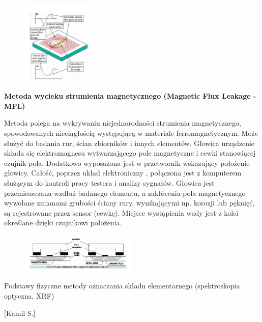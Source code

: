 \documentclass{article}
\begin{document}
\begin{enumerate}
  \begin{figure}[h!]
\centering
\includegraphics[width=0.3\textwidth]{zmiennepole}
\end{figure}
 
 
 
 {\bf Metoda wycieku strumienia magnetycznego (Magnetic Flux Leakage - MFL) }
 
 Metoda polega na wykrywaniu niejednorodności strumienia magnetycznego, spowodowanych nieciągłością występującą w materiale ferromagnetycznym. Może służyć do badania rur, ścian zbiorników i innych elementów. Głowica urządzenie składa się elektromagnesu wytwarzającego pole magnetyczne i cewki stanowiącej czujnik pola. Dodatkowo wyposażona jest w przetwornik wskazujący położenie głowicy. Całość, poprzez układ elektroniczny , połączona jest z komputerem służącym do kontroli pracy testera i analizy sygnałów. Głowica jest przemieszczana wzdłuż badanego elementu, a zakłócenia pola magnetycznego wywołane zmianami grubości ściany rury, wynikającymi np. korozji lub pęknięć, są rejestrowane przez sensor (cewkę). Miejsce wystąpienia wady jest z kolei określane dzięki czujnikowi położenia.
 
 
 
 
   \begin{figure}[h!]
\centering
\includegraphics[width=0.5\textwidth]{wyciek}
\end{figure}
 
 
 
 
 
 
 
 
 
 
 
 


{\Large \bf  \item Podstawy fizyczne metody oznaczania składu elementarnego (spektroskopia
optyczna, XRF)} [Kamil S.]




\end{enumerate}
\end{document}
